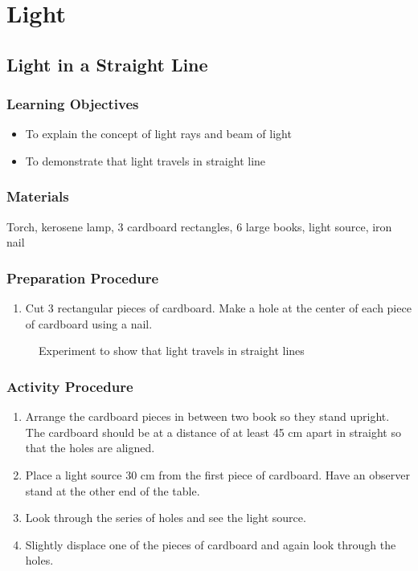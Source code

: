 \section{Light}

\subsection{Light in a Straight Line}

\subsubsection*{Learning Objectives}
\begin{itemize}
\item{To explain the concept of light rays and beam of light} 
\item{To demonstrate that light travels in straight line} 
\end{itemize}

\subsubsection*{Materials}
Torch, kerosene lamp, 3 cardboard rectangles, 6 large books, light source, iron nail

\subsubsection*{Preparation Procedure}
\begin{enumerate}
\item{Cut 3 rectangular pieces of cardboard. Make a hole at the center of each piece of cardboard using a nail.} 
\end{enumerate}

\begin{figure}
\begin{center}
\def\svgwidth{350pt}

\caption{Experiment to show that light travels in straight lines}
\label{fig:prop-of-light}
\end{center}
\end{figure}

\subsubsection*{Activity Procedure}
\begin{enumerate}
\item{Arrange the cardboard pieces in between two book so they stand upright. The cardboard should be at a distance of at least 45 cm apart in straight so that the holes are aligned.} 
\item{Place a light source 30 cm from the first piece of cardboard. Have an observer stand at the other end of the table.} 
\item{Look through the series of holes and see the light source.}
\item{Slightly displace one of the pieces of cardboard and again look through the holes.}
\end{enumerate}

